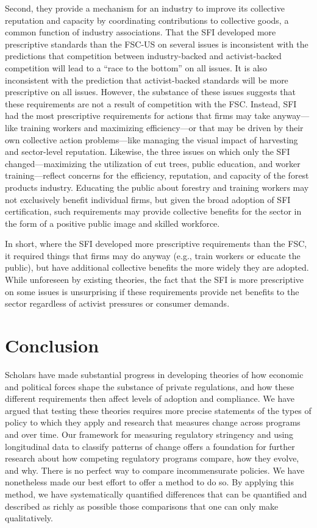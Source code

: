 \documentclass[
      12pt,
            Review ]{article}
\begin{document}
Second, they provide a mechanism for an industry to improve its collective reputation and capacity by coordinating contributions to collective goods, a common function of industry associations. That the SFI developed more prescriptive standards than the FSC-US on several issues is inconsistent with the predictions that competition between industry-backed and activist-backed competition will lead to a ``race to the bottom'' on all issues. It is also inconsistent with the prediction that activist-backed standards will be more prescriptive on all issues. However, the substance of these issues suggests that these requirements are not a result of competition with the FSC. Instead, SFI had the most prescriptive requirements for actions that firms may take anyway---like training workers and maximizing efficiency---or that may be driven by their own collective action problems---like managing the visual impact of harvesting and sector-level reputation. Likewise, the three issues on which only the SFI changed---maximizing the utilization of cut trees, public education, and worker training---reflect concerns for the efficiency, reputation, and capacity of the forest products industry. Educating the public about forestry and training workers may not exclusively benefit individual firms, but given the broad adoption of SFI certification, such requirements may provide collective benefits for the sector in the form of a positive public image and skilled workforce.

In short, where the SFI developed more prescriptive requirements than the FSC, it required things that firms may do anyway (e.g., train workers or educate the public), but have additional collective benefits the more widely they are adopted. While unforeseen by existing theories, the fact that the SFI is more prescriptive on some issues is unsurprising if these requirements provide net benefits to the sector regardless of activist pressures or consumer demands.

\hypertarget{conclusion}{%
\section{Conclusion}\label{conclusion}}

Scholars have made substantial progress in developing theories of how economic and political forces shape the substance of private regulations, and how these different requirements then affect levels of adoption and compliance. We have argued that testing these theories requires more precise statements of the types of policy to which they apply and research that measures change across programs and over time. Our framework for measuring regulatory stringency and using longitudinal data to classify patterns of change offers a foundation for further research about how competing regulatory programs compare, how they evolve, and why. There is no perfect way to compare incommensurate policies. We have nonetheless made our best effort to offer a method to do so. By applying this method, we have systematically quantified differences that can be quantified and described as richly as possible those comparisons that one can only make qualitatively.
\end{document}
